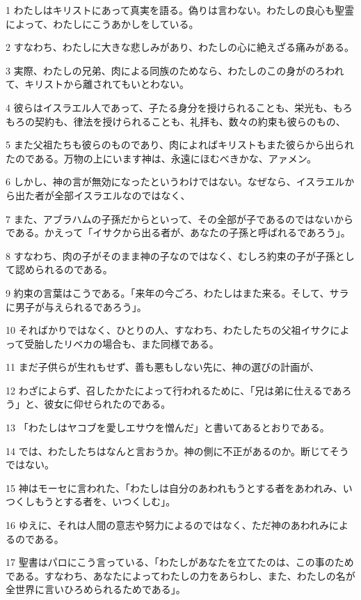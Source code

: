 \par 1 わたしはキリストにあって真実を語る。偽りは言わない。わたしの良心も聖霊によって、わたしにこうあかしをしている。
\par 2 すなわち、わたしに大きな悲しみがあり、わたしの心に絶えざる痛みがある。
\par 3 実際、わたしの兄弟、肉による同族のためなら、わたしのこの身がのろわれて、キリストから離されてもいとわない。
\par 4 彼らはイスラエル人であって、子たる身分を授けられることも、栄光も、もろもろの契約も、律法を授けられることも、礼拝も、数々の約束も彼らのもの、
\par 5 また父祖たちも彼らのものであり、肉によればキリストもまた彼らから出られたのである。万物の上にいます神は、永遠にほむべきかな、アァメン。
\par 6 しかし、神の言が無効になったというわけではない。なぜなら、イスラエルから出た者が全部イスラエルなのではなく、
\par 7 また、アブラハムの子孫だからといって、その全部が子であるのではないからである。かえって「イサクから出る者が、あなたの子孫と呼ばれるであろう」。
\par 8 すなわち、肉の子がそのまま神の子なのではなく、むしろ約束の子が子孫として認められるのである。
\par 9 約束の言葉はこうである。「来年の今ごろ、わたしはまた来る。そして、サラに男子が与えられるであろう」。
\par 10 そればかりではなく、ひとりの人、すなわち、わたしたちの父祖イサクによって受胎したリベカの場合も、また同様である。
\par 11 まだ子供らが生れもせず、善も悪もしない先に、神の選びの計画が、
\par 12 わざによらず、召したかたによって行われるために、「兄は弟に仕えるであろう」と、彼女に仰せられたのである。
\par 13 「わたしはヤコブを愛しエサウを憎んだ」と書いてあるとおりである。
\par 14 では、わたしたちはなんと言おうか。神の側に不正があるのか。断じてそうではない。
\par 15 神はモーセに言われた、「わたしは自分のあわれもうとする者をあわれみ、いつくしもうとする者を、いつくしむ」。
\par 16 ゆえに、それは人間の意志や努力によるのではなく、ただ神のあわれみによるのである。
\par 17 聖書はパロにこう言っている、「わたしがあなたを立てたのは、この事のためである。すなわち、あなたによってわたしの力をあらわし、また、わたしの名が全世界に言いひろめられるためである」。
